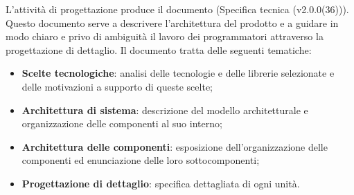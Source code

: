 \documentclass[10pt, a4paper]{article}
\begin{document}
L'attività di progettazione produce il documento (Specifica tecnica (v2.0.0(36))). Questo documento serve a descrivere l'architettura del prodotto e a guidare in modo chiaro e privo di ambiguità il lavoro dei programmatori attraverso la progettazione di dettaglio.
Il documento tratta delle seguenti tematiche:
\begin{itemize}
    \item \textbf{Scelte tecnologiche}: analisi delle tecnologie e delle librerie selezionate e delle motivazioni a supporto di queste scelte;
    \item \textbf{Architettura di sistema}: descrizione del modello architetturale e organizzazione delle componenti al suo interno;
    \item \textbf{Architettura delle componenti}: esposizione dell'organizzazione delle componenti ed enunciazione delle loro sottocomponenti;
    \item \textbf{Progettazione di dettaglio}: specifica dettagliata di ogni unità.
\end{itemize}
\end{document}
